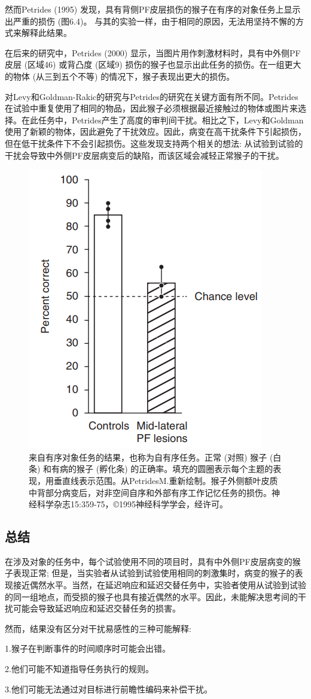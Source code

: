 然而Petrides (1995) 发现，具有背侧PF皮层损伤的猴子在有序的对象任务上显示出严重的损伤 (图6.4)。
与其的实验一样，由于相同的原因，无法用坚持不懈的方式来解释此结果。


在后来的研究中，Petrides (2000) 显示，当图片用作刺激材料时，具有中外侧PF皮层 (区域46) 或背凸度 (区域9) 损伤的猴子也显示出此任务的损伤。在一组更大的物体 (从三到五个不等) 的情况下，猴子表现出更大的损伤。

对Levy和Goldman-Rakic的研究与Petrides的研究在关键方面有所不同。Petrides在试验中重复使用了相同的物品，因此猴子必须根据最近接触过的物体或图片来选择。在此任务中，Petrides产生了高度的审判间干扰。相比之下，Levy和Goldman使用了新颖的物体，因此避免了干扰效应。因此，病变在高干扰条件下引起损伤，但在低干扰条件下不会引起损伤。这些发现支持两个相关的想法: 从试验到试验的干扰会导致中外侧PF皮层病变后的缺陷，而该区域会减轻正常猴子的干扰。
\begin{figure}
	\centering
	\includegraphics[width=0.3\linewidth]{image_pfc/Fig_6_4}
	\caption{来自有序对象任务的结果，也称为自有序任务。正常 (对照) 猴子 (白条) 和有病的猴子 (孵化条) 的正确率。填充的圆圈表示每个主题的表现，用垂直线表示范围。从PetridesM.重新绘制。猴子外侧额叶皮质中背部分病变后，对非空间自序和外部有序工作记忆任务的损伤。神经科学杂志15:359-75，©1995神经科学学会，经许可。}
	\label{fig:fig}
\end{figure}
\subsection{总结}
在涉及对象的任务中，每个试验使用不同的项目时，具有中外侧PF皮层病变的猴子表现正常; 但是，当实验者从试验到试验使用相同的刺激集时，病变的猴子的表现接近偶然水平。当然，在延迟响应和延迟交替任务中，实验者使用从试验到试验的同一组地点，而受损的猴子也具有接近偶然的水平。因此，未能解决思考间的干扰可能会导致延迟响应和延迟交替任务的损害。

然而，结果没有区分对干扰易感性的三种可能解释:
\par
1.猴子在判断事件的时间顺序时可能会出错。
\par
2.他们可能不知道指导任务执行的规则。
\par
3.他们可能无法通过对目标进行前瞻性编码来补偿干扰。

